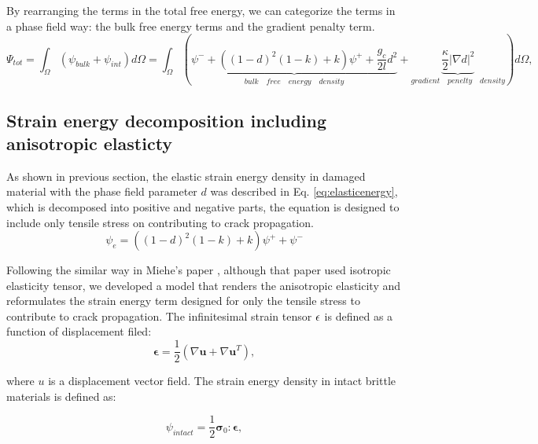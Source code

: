 \documentclass[3p,10pt,sort&compress]{elsarticle}
\begin{document}
By rearranging the terms in the total free energy, we can categorize the terms in a phase field way: the bulk free energy terms and the gradient penalty term.
\[
{\Psi}_{tot} = \int_\Omega (\psi_{bulk}+\psi_{int}) d\Omega= \int_\Omega \left( \underbrace{\psi^- + ((1-d)^2(1-k)+k)\psi^+ + \frac{g_c}{2l}d^2}_{bulk \quad free \quad energy \quad density} + \underbrace{\frac{\kappa}{2} {|\nabla d|}^2}_{gradient \quad penelty \quad density}\right) d\Omega,
\]
\subsection{Strain energy decomposition including anisotropic elasticty}

As shown in previous section, the elastic strain energy density in damaged material with the phase field parameter $d$ was described in Eq. \ref{eq:elasticenergy}, which is decomposed into positive and negative parts, the equation is designed to include only tensile stress on contributing to crack propagation.
\begin{equation}\label{eq:elasticenergy}
  \psi_e = ((1-d)^2(1-k) + k) \psi^+ + \psi^-
\end{equation}



Following the similar way in Miehe's paper \cite{miehe2010phase}, although that paper used isotropic elasticity tensor, we developed a model that renders the anisotropic elasticity and reformulates the strain energy term designed for only the tensile stress to contribute to crack propagation. The infinitesimal strain tensor $\bf{\epsilon}$ is defined as a function of displacement filed:
\begin{equation}
  \boldsymbol{\epsilon} = \frac{1}{2} \left(\nabla \mathbf{u} + \nabla \mathbf{u}^T \right),
\end{equation}

where $u$ is a displacement vector field. The strain energy density in intact brittle materials is defined as:

\begin{equation}
  \psi_{intact} = \frac{1}{2}\boldsymbol{\sigma}_0 : \boldsymbol{\epsilon},
\end{equation}
\end{document}
